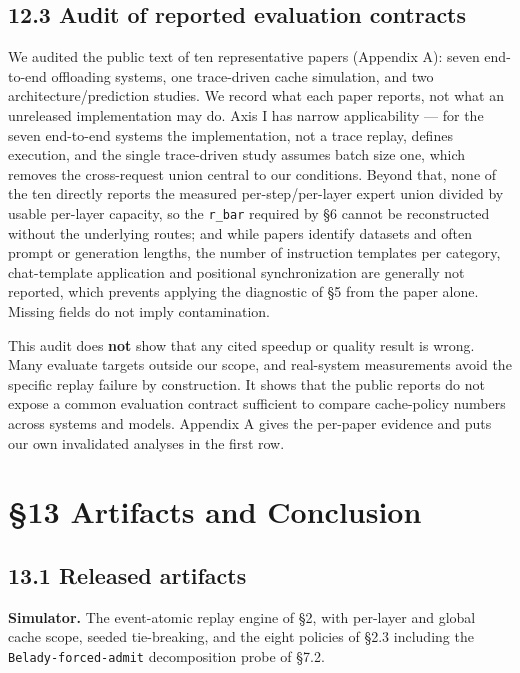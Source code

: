 \documentclass[
  10pt,
  letterpaper,
  10pt]{article}
\newcounter{none} %
\begin{document}
\subsection{12.3 Audit of reported evaluation
contracts}\label{audit-of-reported-evaluation-contracts}

We audited the public text of ten representative papers (Appendix A):
seven end-to-end offloading systems, one trace-driven cache simulation,
and two architecture/prediction studies. We record what each paper
reports, not what an unreleased implementation may do. Axis I has narrow
applicability --- for the seven end-to-end systems the implementation,
not a trace replay, defines execution, and the single trace-driven study
assumes batch size one, which removes the cross-request union central to
our conditions. Beyond that, none of the ten directly reports the
measured per-step/per-layer expert union divided by usable per-layer
capacity, so the \texttt{r\_bar} required by §6 cannot be reconstructed
without the underlying routes; and while papers identify datasets and
often prompt or generation lengths, the number of instruction templates
per category, chat-template application and positional synchronization
are generally not reported, which prevents applying the diagnostic of §5
from the paper alone. Missing fields do not imply contamination.

This audit does \textbf{not} show that any cited speedup or quality
result is wrong. Many evaluate targets outside our scope, and
real-system measurements avoid the specific replay failure by
construction. It shows that the public reports do not expose a common
evaluation contract sufficient to compare cache-policy numbers across
systems and models. Appendix A gives the per-paper evidence and puts our
own invalidated analyses in the first row.

\section{§13 Artifacts and Conclusion}\label{artifacts-and-conclusion}

\subsection{13.1 Released artifacts}\label{released-artifacts}

\textbf{Simulator.} The event-atomic replay engine of §2, with per-layer
and global cache scope, seeded tie-breaking, and the eight policies of
§2.3 including the \texttt{Belady-forced-admit} decomposition probe of
§7.2.
\end{document}
